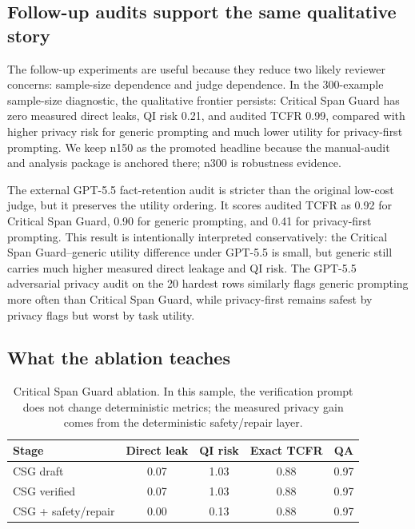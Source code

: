 \documentclass{article}
\newcommand{\method}{Critical Span Guard}
\newcommand{\tcfr}{TCFR}
\begin{document}


\subsection{Follow-up audits support the same qualitative story}

The follow-up experiments are useful because they reduce two likely reviewer
concerns: sample-size dependence and judge dependence.  In the 300-example
sample-size diagnostic, the qualitative frontier persists: \method{} has zero
measured direct leaks, QI risk 0.21, and audited \tcfr{} 0.99, compared with
higher privacy risk for generic prompting and much lower utility for
privacy-first prompting.  We keep n150 as the promoted headline because the
manual-audit and analysis package is anchored there; n300 is robustness evidence.

The external GPT-5.5 fact-retention audit is stricter than the original low-cost
judge, but it preserves the utility ordering.  It scores audited \tcfr{} as 0.92
for \method{}, 0.90 for generic prompting, and 0.41 for privacy-first prompting.
This result is intentionally interpreted conservatively: the \method{}--generic
utility difference under GPT-5.5 is small, but generic still carries much higher
measured direct leakage and QI risk.  The GPT-5.5 adversarial privacy audit on
the 20 hardest rows similarly flags generic prompting more often than \method{},
while privacy-first remains safest by privacy flags but worst by task utility.



\subsection{What the ablation teaches}

\begin{table}[t]
\centering
\small
\begin{tabular}{lcccc}
\toprule
Stage & Direct leak & QI risk & Exact \tcfr{} & QA \\
\midrule
CSG draft & 0.07 & 1.03 & 0.88 & 0.97 \\
CSG verified & 0.07 & 1.03 & 0.88 & 0.97 \\
CSG + safety/repair & 0.00 & 0.13 & 0.88 & 0.97 \\
\bottomrule
\end{tabular}
\caption{\method{} ablation.  In this sample, the verification prompt does not
change deterministic metrics; the measured privacy gain comes from the
deterministic safety/repair layer.}
\label{tab:ablation}
\end{table}
\end{document}
